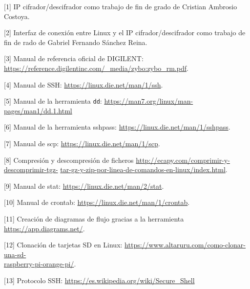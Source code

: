 \hspace{0.5cm}	[\hypertarget{1}{1}] IP cifrador/descifrador como trabajo de fin de grado de Cristian Ambrosio Costoya.

\hspace{0.5cm}	[\hypertarget{2}{2}] Interfaz de conexión entre Linux y el IP cifrador/descifrador como trabajo de fin de rado de Gabriel Fernando Sánchez Reina.

\hspace{0.5cm}	[\hypertarget{3}{3}] Manual de referencia oficial de DIGILENT: \url{https://reference.digilentinc.com/_media/zybo:zybo_rm.pdf}.

\hspace{0.5cm}	[\hypertarget{4}{4}] Manual de SSH: \url{https://linux.die.net/man/1/ssh}.

\hspace{0.5cm}	[\hypertarget{5}{5}] Manual de la herramienta \texttt{dd}: \url{https://man7.org/linux/man-pages/man1/dd.1.html}

\hspace{0.5cm}	[\hypertarget{6}{6}] Manual de la herramienta sshpass: \url{https://linux.die.net/man/1/sshpass}.

\hspace{0.5cm}	[\hypertarget{7}{7}] Manual de scp: \url{https://linux.die.net/man/1/scp}.

\hspace{0.5cm}	[\hypertarget{8}{8}] Compresión y descompresión de ficheros \url{http://ecapy.com/comprimir-y-descomprimir-tgz-} \url{tar-gz-y-zip-por-linea-de-comandos-en-linux/index.html}.

\hspace{0.5cm}	[\hypertarget{9}{9}] Manual de stat: \url{https://linux.die.net/man/2/stat}.

\hspace{0.5cm}	[\hypertarget{10}{10}] Manual de crontab: \url{https://linux.die.net/man/1/crontab}.	
	
\hspace{0.5cm}	[\hypertarget{11}{11}] Creación de diagramas de flujo gracias a la herramienta \url{https://app.diagrams.net/}.
	
\hspace{0.5cm}	[\hypertarget{12}{12}] Clonación de tarjetas SD en Linux: \url{https://www.altaruru.com/como-clonar-una-sd-}\\
	\url{raspberry-pi-orange-pi/}.

\hspace{0.5cm}	[\hypertarget{13}{13}] Protocolo SSH: \url{https://es.wikipedia.org/wiki/Secure_Shell}
